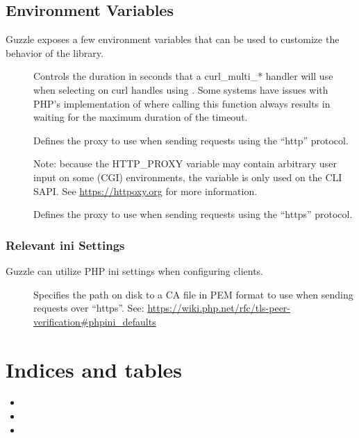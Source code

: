 \documentclass[a4paper,11pt,spanish]{sphinxmanual}
\begin{document}
\chapter{Environment Variables}
\label{\detokenize{quickstart:environment-variables}}
Guzzle exposes a few environment variables that can be used to customize the
behavior of the library.
\begin{description}
\item[{}] \leavevmode
Controls the duration in seconds that a curl\_multi\_* handler will use when
selecting on curl handles using . Some systems
have issues with PHP's implementation of  where
calling this function always results in waiting for the maximum duration of
the timeout.

\item[{}] \leavevmode
Defines the proxy to use when sending requests using the ``http'' protocol.

Note: because the HTTP\_PROXY variable may contain arbitrary user input on some (CGI) environments, the variable is only used on the CLI SAPI. See \url{https://httpoxy.org} for more information.

\item[{}] \leavevmode
Defines the proxy to use when sending requests using the ``https'' protocol.

\end{description}


\section{Relevant ini Settings}
\label{\detokenize{quickstart:relevant-ini-settings}}
Guzzle can utilize PHP ini settings when configuring clients.
\begin{description}
\item[{}] \leavevmode
Specifies the path on disk to a CA file in PEM format to use when sending
requests over ``https''. See: \url{https://wiki.php.net/rfc/tls-peer-verification\#phpini\_defaults}

\end{description}


\part{Indices and tables}
\label{\detokenize{index:indices-and-tables}}\begin{itemize}
\item {} 

\item {} 

\item {} 

\end{itemize}



\renewcommand{\indexname}{Índice}
\printindex
\end{document}
